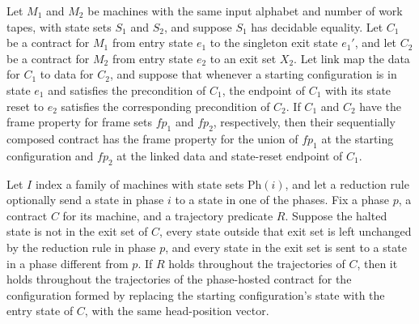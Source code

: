 \begin{theorem}
\label{Turing.Contract.Frames.seq}
\leanok
{}
Let $M_1$ and $M_2$ be machines with the same input alphabet and number of work tapes,
with state sets $S_1$ and $S_2$, and suppose $S_1$ has decidable equality. Let $C_1$ be
a contract for $M_1$ from entry state $e_1$ to the singleton exit state $e_1'$, and let
$C_2$ be a contract for $M_2$ from entry state $e_2$ to an exit set $X_2$. Let
$\mathrm{link}$ map the data for $C_1$ to data for $C_2$, and suppose that whenever a
starting configuration is in state $e_1$ and satisfies the precondition of $C_1$, the
endpoint of $C_1$ with its state reset to $e_2$ satisfies the corresponding precondition
of $C_2$. If $C_1$ and $C_2$ have the frame property for frame sets $fp_1$ and $fp_2$,
respectively, then their sequentially composed contract has the frame property for the
union of $fp_1$ at the starting configuration and $fp_2$ at the linked data and
state-reset endpoint of $C_1$.
\end{theorem}

\begin{theorem}
\label{Turing.Contract.Traj.inPhase}
\leanok
{}
Let $I$ index a family of machines with state sets $\mathrm{Ph}(i)$, and let a reduction
rule optionally send a state in phase $i$ to a state in one of the phases. Fix a phase
$p$, a contract $C$ for its machine, and a trajectory predicate $R$. Suppose the halted
state is not in the exit set of $C$, every state outside that exit set is left unchanged
by the reduction rule in phase $p$, and every state in the exit set is sent to a state
in a phase different from $p$. If $R$ holds throughout the trajectories of $C$, then it
holds throughout the trajectories of the phase-hosted contract for the configuration
formed by replacing the starting configuration's state with the entry state of $C$, with
the same head-position vector.
\end{theorem}

